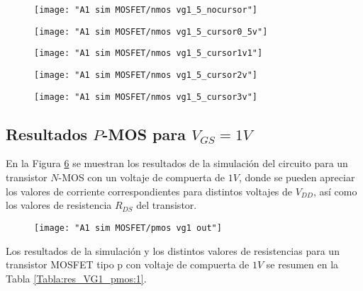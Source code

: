 \documentclass[9pt,technote]{IEEEtran}
\begin{document}
    \begin{figure}[H]
    	\centering
    	\texttt{[image: "A1 sim MOSFET/nmos vg1\_5\_nocursor"]}
    	\caption{}
    	\label{fig:nmos-vg15nocursor}
    \end{figure}
    
    \begin{figure}[H]
    	\centering
    	\texttt{[image: "A1 sim MOSFET/nmos vg1\_5\_cursor0\_5v"]}
    	\caption{}
    	\label{fig:nmos-vg15cursor05v}
    \end{figure}
    
    \begin{figure}[H]
    	\centering
    	\texttt{[image: "A1 sim MOSFET/nmos vg1\_5\_cursor1v1"]}
    	\caption{}
    	\label{fig:nmos-vg15cursor1v1}
    \end{figure}
    
    \begin{figure}[H]
    	\centering
    	\texttt{[image: "A1 sim MOSFET/nmos vg1\_5\_cursor2v"]}
    	\caption{}
    	\label{fig:nmos-vg15cursor2v}
    \end{figure}
    
    \begin{figure}[H]
    	\centering
    	\texttt{[image: "A1 sim MOSFET/nmos vg1\_5\_cursor3v"]}
    	\caption{}
    	\label{fig:nmos-vg15cursor3v}
    \end{figure}
    
	\subsection*{Resultados $P$-MOS para $V_{GS}=1V$}

	En la Figura \ref{fig:pmos-vg1-out} se muestran los resultados de la simulación del circuito para un transistor $N$-MOS con un voltaje de compuerta de $1V$, donde se pueden apreciar los valores de corriente correspondientes para distintos voltajes de $V_{DD}$, así como los valores de resistencia $R_{DS}$ del transistor.
	
	\begin{figure}[H]
		\centering
		\texttt{[image: "A1 sim MOSFET/pmos vg1 out"]}
		\caption{}
		\label{fig:pmos-vg1-out}
	\end{figure}
	
    Los resultados de la simulación y los distintos valores de resistencias para un transistor MOSFET tipo p con voltaje de compuerta de $1V$ se resumen en la Tabla \ref{Tabla:res_VG1_pmos:1}.
	
\end{document}
